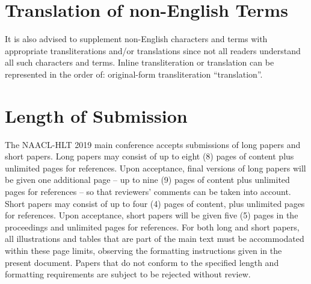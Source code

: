 \documentclass{article}
\begin{document}


\section{Translation of non-English Terms}

It is also advised to supplement non-English characters and terms
with appropriate transliterations and/or translations
since not all readers understand all such characters and terms.
Inline transliteration or translation can be represented in
the order of: original-form transliteration ``translation''.

\section{Length of Submission}
\label{sec:length}

The NAACL-HLT 2019 main conference accepts submissions of long papers and
short papers.
 Long papers may consist of up to eight (8) pages of
content plus unlimited pages for references. Upon acceptance, final
versions of long papers will be given one additional page -- up to nine (9)
pages of content plus unlimited pages for references -- so that reviewers' comments
can be taken into account. Short papers may consist of up to four (4)
pages of content, plus unlimited pages for references. Upon
acceptance, short papers will be given five (5) pages in the
proceedings and unlimited pages for references. 
For both long and short papers, all illustrations and tables that are part
of the main text must be accommodated within these page limits, observing
the formatting instructions given in the present document. Papers that do not conform to the specified length and formatting requirements are subject to be rejected without review.
\end{document}

